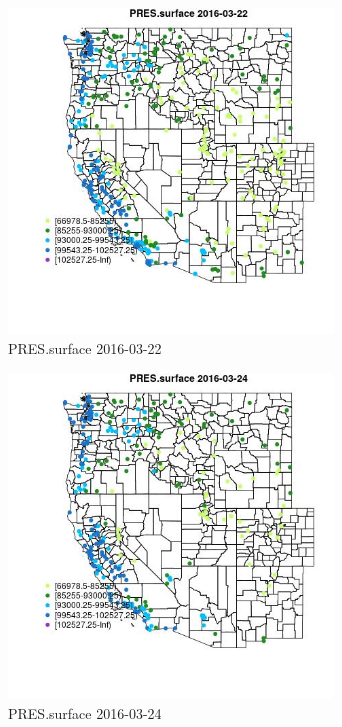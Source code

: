 \begin{figure} 
\centering  
\includegraphics[width=0.77\textwidth]{Code_Outputs/Report_ML_input_PM25_Step4_part_e_de_duplicated_aveswNAs_MapObsPRESsurface2016-03-22.jpg} 
\caption{\label{fig:Report_ML_input_PM25_Step4_part_e_de_duplicated_aveswNAsMapObsPRESsurface2016-03-22}PRES.surface 2016-03-22} 
\end{figure} 
 

\begin{figure} 
\centering  
\includegraphics[width=0.77\textwidth]{Code_Outputs/Report_ML_input_PM25_Step4_part_e_de_duplicated_aveswNAs_MapObsPRESsurface2016-03-24.jpg} 
\caption{\label{fig:Report_ML_input_PM25_Step4_part_e_de_duplicated_aveswNAsMapObsPRESsurface2016-03-24}PRES.surface 2016-03-24} 
\end{figure} 
 

